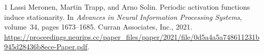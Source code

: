 \documentclass[11pt]{article}
\begin{document}
\begin{thebibliography}{1}
Lassi Meronen, Martin Trapp, and Arno Solin.
\newblock Periodic activation functions induce stationarity.
\newblock In \emph{Advances in Neural Information Processing Systems},
volume~34, pages 1673--1685. Curran Associates, Inc., 2021.
\newblock \url{https://proceedings.neurips.cc/paper_files/paper/2021/file/0d5a4a5a748611231b945d28436b8ece-Paper.pdf}.
\end{thebibliography}
\end{document}
